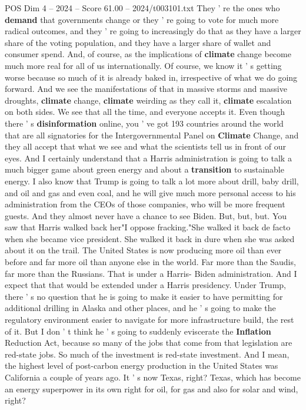 \begin{textsample}{POS Dim 4 – 2024 – Score 61.00 – 2024/t003101.txt}
They ' re the ones who \textbf{demand} that governments change or they ' re going to vote for much more radical outcomes, and they ' re going to increasingly do that as they have a larger share of the voting population, and they have a larger share of wallet and consumer spend.
And, of course, as the implications of \textbf{climate} change become much more real for all of us internationally.
Of course, we know it ' s getting worse because so much of it is already baked in, irrespective of what we do going forward.
And we see the manifestations of that in massive storms and massive droughts, \textbf{climate} change, \textbf{climate} weirding as they call it, \textbf{climate} escalation on both sides.
We see that all the time, and everyone accepts it.
Even though there ' s \textbf{disinformation} online, you ' ve got 193 countries around the world that are all signatories for the Intergovernmental Panel on \textbf{Climate} Change, and they all accept that what we see and what the scientists tell us in front of our eyes.
And I certainly understand that a Harris administration is going to talk a much bigger game about green energy and about a \textbf{transition} to sustainable energy.
I also know that Trump is going to talk a lot more about drill, baby drill, and oil and gas and even coal, and he will give much more personal access to his administration from the CEOs of those companies, who will be more frequent guests.
And they almost never have a chance to see Biden.
But, but, but.
You saw that Harris walked back her"I oppose fracking."She walked it back de facto when she became vice president.
She walked it back in dure when she was asked about it on the trail.
The United States is now producing more oil than ever before and far more oil than anyone else in the world.
Far more than the Saudis, far more than the Russians.
That is under a Harris- Biden administration.
And I expect that that would be extended under a Harris presidency.
Under Trump, there ' s no question that he is going to make it easier to have permitting for additional drilling in Alaska and other places, and he ' s going to make the regulatory environment easier to navigate for more infrastructure build, the rest of it.
But I don ' t think he ' s going to suddenly eviscerate the \textbf{Inflation} Reduction Act, because so many of the jobs that come from that legislation are red-state jobs.
So much of the investment is red-state investment.
And I mean, the highest level of post-carbon energy production in the United States was California a couple of years ago.
It ' s now Texas, right?
Texas, which has become an energy superpower in its own right for oil, for gas and also for solar and wind, right?

\end{textsample}
